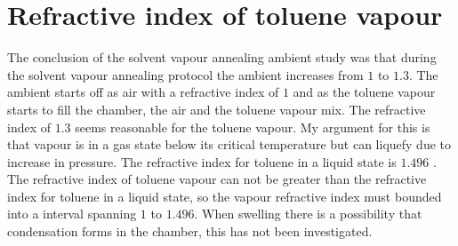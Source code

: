 \documentclass[MasterThesisMain.tex]{subfiles}
\begin{document}
\section{Refractive index of toluene vapour}   
The conclusion of the solvent vapour annealing ambient study was that during the solvent vapour annealing protocol the ambient increases from $1$ to $1.3$. The ambient starts off as air with a refractive index of $1$ and as the toluene vapour starts to fill the chamber, the air and the toluene vapour mix. The refractive index of $1.3$ seems reasonable for the toluene vapour. My argument for this is that vapour is in a gas state below its critical temperature but can liquefy due to increase in pressure. The refractive index for toluene in a liquid state is $1.496$ \cite{toluene}. The refractive index of toluene vapour can not be greater than the refractive index for toluene in a liquid state, so the vapour refractive index must bounded into a interval spanning $1$ to $1.496$. When swelling there is a possibility that condensation forms in the chamber, this has not been investigated.  
\end{document}
